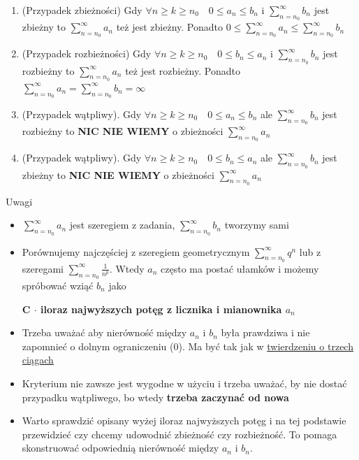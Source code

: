\begin{enumerate}
    \item (Przypadek zbieżności) Gdy $ \forall n \geq k \geq n_0 \quad 0 \leq a_n \leq b_n $ i $ \sum\limits_{n = n_0}^{\infty} b_n $
    jest zbieżny to $ \sum\limits_{n = n_0}^{\infty} a_n $ też jest zbieżny. Ponadto
    $ 0 \leq \sum\limits_{n = n_0}^{\infty} a_n \leq \sum\limits_{n = n_0}^{\infty} b_n $
    
    \item (Przypadek rozbieżności) Gdy $ \forall n \geq k \geq n_0 \quad 0 \leq b_n \leq a_n $ i $ \sum\limits_{n = n_0}^{\infty} b_n $
    jest rozbieżny to $ \sum\limits_{n = n_0}^{\infty} a_n $ też jest rozbieżny. Ponadto
    $ \sum\limits_{n = n_0}^{\infty} a_n = \sum\limits_{n = n_0}^{\infty} b_n = \infty $

    \item (Przypadek wątpliwy). Gdy $ \forall n \geq k \geq n_0 \quad 0 \leq a_n \leq b_n $ ale $ \sum\limits_{n = n_0}^{\infty} b_n $ jest
    rozbieżny to \textbf{NIC NIE WIEMY} o zbieżności $ \sum\limits_{n = n_0}^{\infty} a_n $

    \item (Przypadek wątpliwy). Gdy $ \forall n \geq k \geq n_0 \quad 0 \leq b_n \leq a_n $ ale $ \sum\limits_{n = n_0}^{\infty} b_n $ jest
    zbieżny to \textbf{NIC NIE WIEMY} o zbieżności $ \sum\limits_{n = n_0}^{\infty} a_n $ \\
\end{enumerate}

Uwagi

\begin{itemize}
    \item $ \sum\limits_{n = n_0}^{\infty} a_n $ jest szeregiem z zadania, $ \sum\limits_{n = n_0}^{\infty} b_n $ tworzymy sami
    \item Porównujemy najczęściej z szeregiem geometrycznym $ \sum\limits_{n = n_0}^{\infty} q^n $ lub z szeregami
    $ \sum\limits_{n = n_0}^{\infty} \frac{1}{n^p} $. Wtedy $a_n$ często ma postać ułamków i możemy spróbować wziąć $b_n$ jako

    \quad \textbf{C $\cdot$ iloraz najwyższych potęg z licznika i mianownika $a_n$} 

    \item Trzeba uważać aby nierówność między $a_n$ i $b_n$ była prawdziwa i nie zapomnieć o dolnym ograniczeniu (0). Ma być
    tak jak w \underline{twierdzeniu o trzech ciągach}

    \item Kryterium nie zawsze jest wygodne w użyciu i trzeba uważać, by nie dostać przypadku wątpliwego, bo wtedy \textbf{trzeba zaczynać od nowa}
    
    \item Warto sprawdzić opisany wyżej iloraz najwyższych potęg i na tej podstawie przewidzieć czy chcemy udowodnić zbieżność
    czy rozbieżność. To pomaga skonstruować odpowiednią nierówność między $a_n$ i $b_n$.
\end{itemize}

